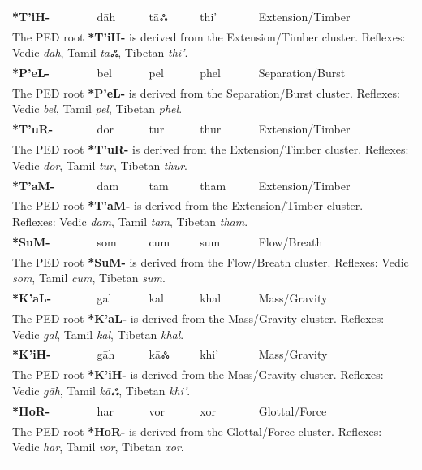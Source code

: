 \begin{longtable}{p{} p{} p{} p{} p{}}
\textbf{*T'iH-} & dāh & tāஃ & thi' & Extension/Timber \\ 
\multicolumn{5}{p{\textwidth}}{\small The PED root \textbf{*T'iH-} is derived from the Extension/Timber cluster. Reflexes: Vedic \textit{dāh}, Tamil \textit{tāஃ}, Tibetan \textit{thi'}. } \\ \addlinespace 
\textbf{*P'eL-} & bel & pel & phel & Separation/Burst \\ 
\multicolumn{5}{p{\textwidth}}{\small The PED root \textbf{*P'eL-} is derived from the Separation/Burst cluster. Reflexes: Vedic \textit{bel}, Tamil \textit{pel}, Tibetan \textit{phel}. } \\ \addlinespace 
\textbf{*T'uR-} & dor & tur & thur & Extension/Timber \\ 
\multicolumn{5}{p{\textwidth}}{\small The PED root \textbf{*T'uR-} is derived from the Extension/Timber cluster. Reflexes: Vedic \textit{dor}, Tamil \textit{tur}, Tibetan \textit{thur}. } \\ \addlinespace 
\textbf{*T'aM-} & dam & tam & tham & Extension/Timber \\ 
\multicolumn{5}{p{\textwidth}}{\small The PED root \textbf{*T'aM-} is derived from the Extension/Timber cluster. Reflexes: Vedic \textit{dam}, Tamil \textit{tam}, Tibetan \textit{tham}. } \\ \addlinespace 
\textbf{*SuM-} & som & cum & sum & Flow/Breath \\ 
\multicolumn{5}{p{\textwidth}}{\small The PED root \textbf{*SuM-} is derived from the Flow/Breath cluster. Reflexes: Vedic \textit{som}, Tamil \textit{cum}, Tibetan \textit{sum}. } \\ \addlinespace 
\textbf{*K'aL-} & gal & kal & khal & Mass/Gravity \\ 
\multicolumn{5}{p{\textwidth}}{\small The PED root \textbf{*K'aL-} is derived from the Mass/Gravity cluster. Reflexes: Vedic \textit{gal}, Tamil \textit{kal}, Tibetan \textit{khal}. } \\ \addlinespace 
\textbf{*K'iH-} & gāh & kāஃ & khi' & Mass/Gravity \\ 
\multicolumn{5}{p{\textwidth}}{\small The PED root \textbf{*K'iH-} is derived from the Mass/Gravity cluster. Reflexes: Vedic \textit{gāh}, Tamil \textit{kāஃ}, Tibetan \textit{khi'}. } \\ \addlinespace 
\textbf{*HoR-} & har & vor & xor & Glottal/Force \\ 
\multicolumn{5}{p{\textwidth}}{\small The PED root \textbf{*HoR-} is derived from the Glottal/Force cluster. Reflexes: Vedic \textit{har}, Tamil \textit{vor}, Tibetan \textit{xor}. } \\ \addlinespace 

\end{longtable}
